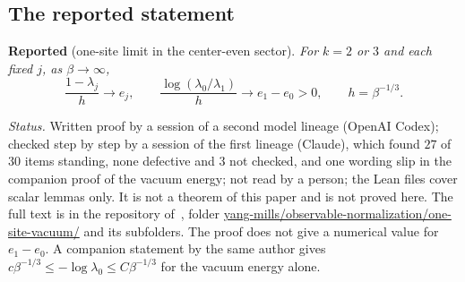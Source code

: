 \subsection{The reported statement}

\medskip\noindent\textbf{Reported} (one-site limit in the center-even sector). \emph{For $k=2$ or $3$ and
each fixed $j$, as $\beta\to\infty$,}
\[
\frac{1-\lambda_j}{h}\longrightarrow e_j,\qquad
\frac{\log(\lambda_0/\lambda_1)}{h}\longrightarrow e_1-e_0>0,\qquad h=\beta^{-1/3}.
\]

\noindent\emph{Status.} Written proof by a session of a second model lineage (OpenAI Codex);
checked step by step by a session of the first lineage (Claude), which found $27$ of $30$ items
standing, none defective and $3$ not checked, and one wording slip in the companion proof of the vacuum
energy; not read by a person; the Lean files cover scalar lemmas only. It is not a theorem of this paper and is
not proved here. The full text is in the repository of~\cite{Repo}, folder
\url{yang-mills/observable-normalization/one-site-vacuum/} and its subfolders.
The proof does not give a numerical value for $e_1-e_0$. A companion statement by the same author
gives $c\beta^{-1/3}\le-\log\lambda_0\le C\beta^{-1/3}$ for the vacuum energy alone.


